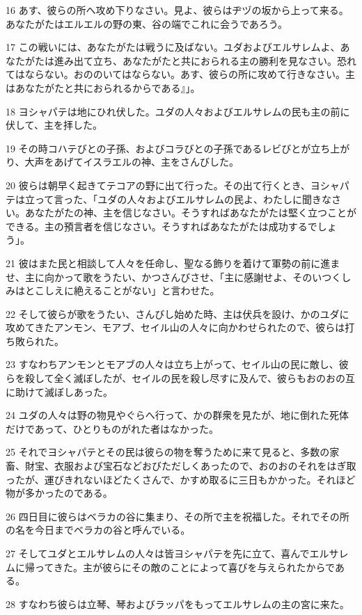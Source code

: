 \par 16 あす、彼らの所へ攻め下りなさい。見よ、彼らはヂヅの坂から上って来る。あなたがたはエルエルの野の東、谷の端でこれに会うであろう。
\par 17 この戦いには、あなたがたは戦うに及ばない。ユダおよびエルサレムよ、あなたがたは進み出て立ち、あなたがたと共におられる主の勝利を見なさい。恐れてはならない。おののいてはならない。あす、彼らの所に攻めて行きなさい。主はあなたがたと共におられるからである』」。
\par 18 ヨシャパテは地にひれ伏した。ユダの人々およびエルサレムの民も主の前に伏して、主を拝した。
\par 19 その時コハテびとの子孫、およびコラびとの子孫であるレビびとが立ち上がり、大声をあげてイスラエルの神、主をさんびした。
\par 20 彼らは朝早く起きてテコアの野に出て行った。その出て行くとき、ヨシャパテは立って言った、「ユダの人々およびエルサレムの民よ、わたしに聞きなさい。あなたがたの神、主を信じなさい。そうすればあなたがたは堅く立つことができる。主の預言者を信じなさい。そうすればあなたがたは成功するでしょう」。
\par 21 彼はまた民と相談して人々を任命し、聖なる飾りを着けて軍勢の前に進ませ、主に向かって歌をうたい、かつさんびさせ、「主に感謝せよ、そのいつくしみはとこしえに絶えることがない」と言わせた。
\par 22 そして彼らが歌をうたい、さんびし始めた時、主は伏兵を設け、かのユダに攻めてきたアンモン、モアブ、セイル山の人々に向かわせられたので、彼らは打ち敗られた。
\par 23 すなわちアンモンとモアブの人々は立ち上がって、セイル山の民に敵し、彼らを殺して全く滅ぼしたが、セイルの民を殺し尽すに及んで、彼らもおのおの互に助けて滅ぼしあった。
\par 24 ユダの人々は野の物見やぐらへ行って、かの群衆を見たが、地に倒れた死体だけであって、ひとりものがれた者はなかった。
\par 25 それでヨシャパテとその民は彼らの物を奪うために来て見ると、多数の家畜、財宝、衣服および宝石などおびただしくあったので、おのおのそれをはぎ取ったが、運びきれないほどたくさんで、かすめ取るに三日もかかった。それほど物が多かったのである。
\par 26 四日目に彼らはベラカの谷に集まり、その所で主を祝福した。それでその所の名を今日までベラカの谷と呼んでいる。
\par 27 そしてユダとエルサレムの人々は皆ヨシャパテを先に立て、喜んでエルサレムに帰ってきた。主が彼らにその敵のことによって喜びを与えられたからである。
\par 28 すなわち彼らは立琴、琴およびラッパをもってエルサレムの主の宮に来た。
